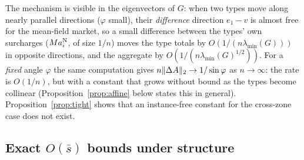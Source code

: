 The mechanism is visible in the eigenvectors of $G$: when two types move along nearly parallel directions ($\varphi$ small), their \emph{difference} direction $e_1-v$ is almost free for the mean-field market, so a small difference between the types' own surcharges ($Ma_i^{\mathrm{N}}$, of size $1/n$) moves the type totals by $O(1/(n\lambda_{\min}(G)))$ in opposite directions, and the aggregate by $O(1/(n\lambda_{\min}(G)^{1/2}))$. For a \emph{fixed} angle $\varphi$ the same computation gives $n\lVert \Delta A\rVert_2\to1/\sin\varphi$ as $n\to\infty$: the rate is $O(1/n)$, but with a constant that grows without bound as the types become collinear (Proposition~\ref{prop:affine} below states this in general). Proposition~\ref{prop:tight} shows that an instance-free constant for the cross-zone case does not exist.

\subsection{Exact $O(\bar s)$ bounds under structure}

